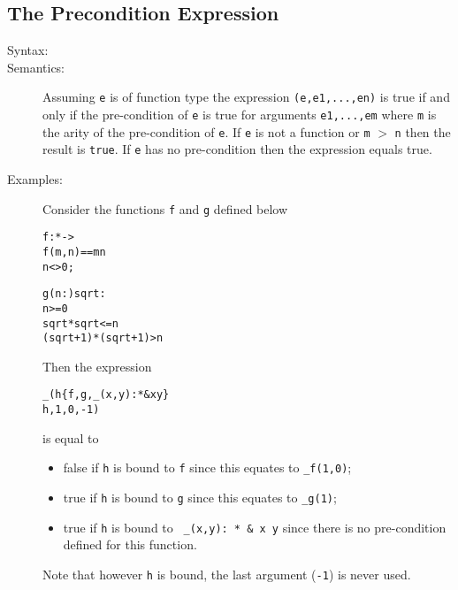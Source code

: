 \documentclass[\pformat,12pt]{article}
\begin{document}
\subsection{The Precondition Expression}
\begin{description}
\item[Syntax:]
  
\item[Semantics:] 
  Assuming \texttt{e} is of function type the expression
  \texttt{(e,e1,...,en)} is true if and only if the
  pre-condition of \texttt{e} is true for arguments \texttt{e1,...,em}
  where \texttt{m} is the arity of the pre-condition of \texttt{e}. If
  \texttt{e} is not a function or \texttt{m} $>$ \texttt{n} then the
  result is \texttt{true}. If \texttt{e} has no pre-condition then the
  expression equals true.
\item[Examples:] 
  Consider the functions \texttt{f} and \texttt{g} defined below
  \begin{alltt}
  f :  *  -> 
  f(m,n) == m  n
   n <> 0;

  g (n: ) sqrt:
   n >= 0
   sqrt * sqrt <= n 
       (sqrt+1) * (sqrt+1) > n
  \end{alltt}
  Then the expression
  \begin{alltt}
  \_( h  \{f,g, \_(x,y): *  & x  y\} 
        h, 1,0,-1)
  \end{alltt}  
  is equal to 
  \begin{itemize}
  \item false if \texttt{h} is bound to \texttt{f} since this equates
        to \texttt{\_f(1,0)};
  \item true if \texttt{h} is bound to \texttt{g} since this equates
        to \texttt{\_g(1)};
  \item true if \texttt{h} is bound to 
        \texttt{ \_(x,y): *  \& x  y} since there is no
        pre-condition defined for this function.
  \end{itemize}
  Note that however \texttt{h} is bound, the last argument
  (\texttt{-1}) is never used.
\end{description}
\end{document}
